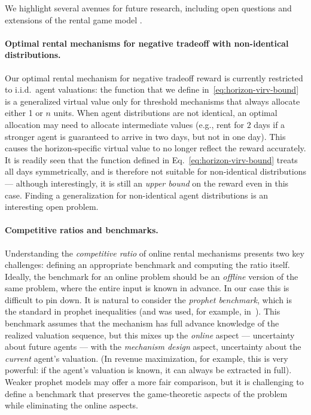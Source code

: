 \documentclass[11pt,letterpaper]{article}
\theoremstyle{plain}
\begin{document}
We highlight several avenues for future research, including open questions and extensions of the rental game model .

\paragraph{Optimal rental mechanisms for negative tradeoff with non-identical distributions.}  
Our optimal rental mechanism for negative tradeoff reward is currently restricted to i.i.d.\ agent valuations:
the function that we define in~\eqref{eq:horizon-virv-bound}
is a generalized virtual value only for threshold mechanisms that always allocate either 1 or $n$ units.
When agent distributions are not identical,
an optimal allocation may need to allocate intermediate values 
(e.g., rent for $2$ days if a stronger agent is guaranteed to arrive in two days, but not in one day).
This causes the horizon-specific virtual value to no longer reflect the reward accurately.
It is readily seen that the function defined in Eq.~\ref{eq:horizon-virv-bound} treats all days symmetrically,
and is therefore not suitable for non-identical distributions --- although interestingly, it is still an \emph{upper bound} on the reward even in this case.
Finding a generalization
for non-identical agent distributions
is an interesting open problem.


\paragraph{Competitive ratios and benchmarks.}  
Understanding the \emph{competitive ratio} of online rental mechanisms presents two key challenges: defining an appropriate benchmark and computing the ratio itself. Ideally, the benchmark for an online problem should be an \emph{offline} version of the same problem, where the entire input is known in advance. In our case this is difficult to pin down. It is natural to consider the \emph{prophet benchmark}, which is the standard in prophet inequalities (and was used, for example, in~\cite{AbelsPS23}). 
This benchmark assumes that the mechanism has full {advance knowledge} of the realized valuation sequence, but this mixes up the \emph{online} aspect --- uncertainty about future agents --- with the \emph{mechanism design} aspect, uncertainty about the \emph{current} agent's valuation.
(In revenue maximization,
for example, this is very powerful:
if the agent's valuation is known, it can always be extracted in full).
Weaker prophet models may offer a more fair comparison, but it is challenging to define a benchmark that preserves the game-theoretic aspects of the problem while eliminating the online aspects.
\end{document}
